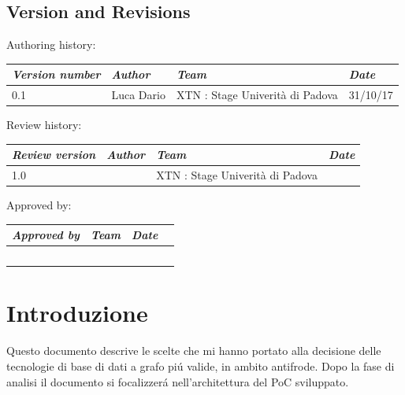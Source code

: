 \documentclass[11pt,a4paper]{scrartcl}
\newcommand{\companyName}{XTN : Stage Univerit\`a di Padova}
\begin{document}
\subsection{Version and Revisions}

Authoring history:
\begin{center}
    \raggedright
    \begin{tabular}{|p{3cm}|p{3cm}|p{3.5cm}|p{2cm}|}
    \hline
    \textit{Version number} & \textit{Author} & \textit{Team} & \textit{Date} \\
    \hline  0.1 & Luca Dario & \companyName & 31/10/17 \\
    \hline
    \end{tabular}
\end{center}

Review history:
\begin{center}
    \raggedright
    \begin{tabular}{|p{3cm}|p{3cm}|p{3.5cm}|p{2cm}|}
    \hline
    \textit{Review version} & \textit{Author} & \textit{Team} & \textit{Date} \\
    \hline    1.0 & ~ & \companyName & ~ \\
    \hline
    \end{tabular}
\end{center}

Approved by:
\begin{center}
    \raggedright
    \begin{tabular}{|p{3cm}|p{3cm}|p{2cm}|p{2cm}|}
    \hline
    \textit{Approved by} & \textit{Team} & \textit{Date} \\
    \hline ~ & ~ & ~ \\
    \hline
    \end{tabular}
\end{center}

\pagebreak %

\section{Introduzione}
Questo documento descrive le scelte che mi hanno portato alla decisione delle tecnologie di base di dati a grafo pi\'u valide, in ambito antifrode.
Dopo la fase di analisi il documento si focalizzer\'a nell'architettura del PoC sviluppato.

\pagebreak %







\end{document}
